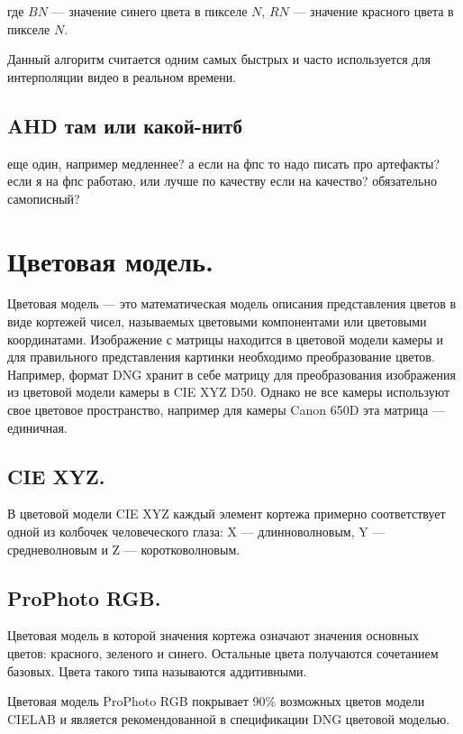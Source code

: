 где $BN$ --- значение синего цвета в пикселе $N$, $RN$ --- значение красного цвета в пикселе $N$.

Данный алгоритм считается одним самых быстрых и часто используется для интерполяции видео в реальном времени.

\subsection{AHD там или какой-нитб}

еще один, например медленнее?
а если на фпс то надо писать про артефакты?
если я на фпс работаю, или лучше по качеству если на качество? обязательно самописный?

\section{Цветовая модель.}
Цветовая модель --- это математическая модель описания представления цветов в виде кортежей чисел, называемых цветовыми компонентами или цветовыми координатами. Изображение с матрицы находится в цветовой модели камеры и для правильного представления картинки необходимо преобразование цветов. Например, формат DNG хранит в себе матрицу для преобразования изображения из цветовой модели камеры в CIE XYZ D50. Однако не все камеры используют свое цветовое пространство, например для камеры Canon 650D эта матрица --- единичная.

\subsection{CIE XYZ.}
В цветовой модели CIE XYZ каждый элемент кортежа примерно соответствует одной из колбочек человеческого глаза: X --- длинноволновым, Y --- средневолновым и Z --- коротковолновым.


\subsection{ProPhoto RGB.}
Цветовая модель в которой значения кортежа означают значения основных цветов: красного, зеленого и синего. Остальные цвета получаются сочетанием базовых. Цвета такого типа называются аддитивными.

Цветовая модель ProPhoto RGB покрывает 90\% возможных цветов модели CIELAB и является рекомендованной в спецификации DNG цветовой моделью. \cite{dngspec}

